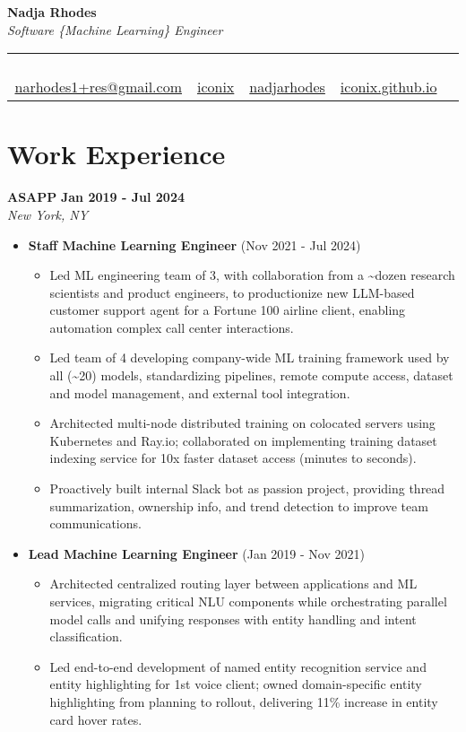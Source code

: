 \documentclass[10pt,letterpaper]{article}
\newcommand{\contactinfo}[5]{
  \begin{center}
    {\huge\textbf{#1}}\\[0.1em]
    {\large\textit{#2}}\\[0.3em]
    \begin{tabular}{ccccc}
      \faEnvelope\, \href{mailto:#3}{#3} &
      \faGithub\, \href{https://github.com/#4}{#4} &
      \faLinkedin\, \href{https://linkedin.com/in/#5}{#5} &
      \faGlobe\, \href{https://#4.github.io}{#4.github.io}
    \end{tabular}
  \end{center}
}
\newcommand{\experienceentry}[5]{
  \noindent\textbf{#1} \hfill \textbf{#2}\\
  \textit{#3} \hfill \textit{#4}\\[-8pt]
  #5
}
\begin{document}
\contactinfo{Nadja Rhodes}{Software \{Machine Learning\} Engineer}{narhodes1+res@gmail.com}{iconix}{nadjarhodes}

\section{Work Experience}
\experienceentry{ASAPP}{Jan 2019 - Jul 2024}{New York, NY}{}{
\begin{itemize}
  \item \textbf{Staff Machine Learning Engineer} (Nov 2021 - Jul 2024)
  \begin{itemize}
    \item Led ML engineering team of 3, with collaboration from a \~{}dozen research scientists and product engineers, to productionize new LLM-based customer support agent for a Fortune 100 airline client, enabling automation complex call center interactions.
    \item Led team of 4 developing company-wide ML training framework used by all (\~{}20) models, standardizing pipelines, remote compute access, dataset and model management, and external tool integration.
    \item Architected multi-node distributed training on colocated servers using Kubernetes and Ray.io; collaborated on implementing training dataset indexing service for 10x faster dataset access (minutes to seconds).
    \item Proactively built internal Slack bot as passion project, providing thread summarization, ownership info, and trend detection to improve team communications.
  \end{itemize}
  \item \textbf{Lead Machine Learning Engineer} (Jan 2019 - Nov 2021)
  \begin{itemize}
    \item Architected centralized routing layer between applications and ML services, migrating critical NLU components while orchestrating parallel model calls and unifying responses with entity handling and intent classification.
    \item Led end-to-end development of named entity recognition service and entity highlighting for 1st voice client; owned domain-specific entity highlighting from planning to rollout, delivering 11\% increase in entity card hover rates.
  \end{itemize}
\end{itemize}
}

\vspace{0.3em}
\end{document}
